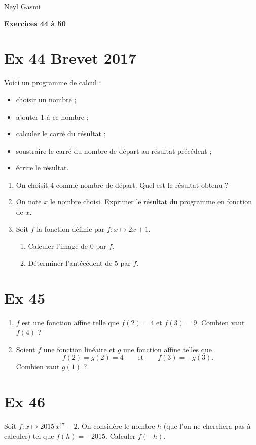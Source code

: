 \documentclass[a4paper,11pt]{article}
\begin{document}
Neyl Gasmi
\begin{center}
{\Large \textbf{Exercices 44 à 50}}
\end{center}
\bigskip

\section*{Ex 44 \quad Brevet 2017}
Voici un programme de calcul :
\begin{itemize}
  \item choisir un nombre ;
  \item ajouter 1 à ce nombre ;
  \item calculer le carré du résultat ;
  \item soustraire le carré du nombre de départ au résultat précédent ;
  \item écrire le résultat.
\end{itemize}
\begin{enumerate}
  \item On choisit \(4\) comme nombre de départ. Quel est le résultat obtenu ?
  \item On note \(x\) le nombre choisi. Exprimer le résultat du programme en fonction de \(x\).
  \item Soit \(f\) la fonction définie par \(f:x\mapsto 2x+1\).
  \begin{enumerate}
    \item Calculer l’image de \(0\) par \(f\).
    \item Déterminer l’antécédent de \(5\) par \(f\).
  \end{enumerate}
\end{enumerate}

\section*{Ex 45}
\begin{enumerate}
  \item \(f\) est une fonction affine telle que \(f(2)=4\) et \(f(3)=9\). Combien vaut \(f(4)\) ?
  \item Soient \(f\) une fonction linéaire et \(g\) une fonction affine telles que
  \[
     f(2)=g(2)=4 \qquad \text{et} \qquad f(3)=-g(3).
  \]
  Combien vaut \(g(1)\) ?
\end{enumerate}

\section*{Ex 46}
Soit \(f:x\mapsto 2015\,x^{17}-2\).
On considère le nombre \(h\) (que l’on ne cherchera pas à calculer) tel que \(f(h)=-2015\).
Calculer \(f(-h)\).
\end{document}
